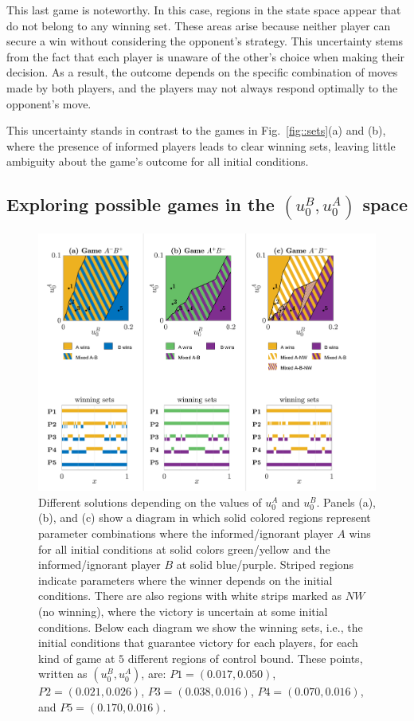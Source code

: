 This last game is noteworthy. In this case, regions in the state space appear that do not belong to any winning set. These areas arise because neither player can secure a win without considering the opponent’s strategy. This uncertainty stems from the fact that each player is unaware of the other’s choice when making their decision. As a result, the outcome depends on the specific combination of moves made by both players, and the players may not always respond optimally to the opponent's move.

This uncertainty stands in contrast to the games in Fig.~\ref{fig::sets}(a) and (b), where the presence of informed players leads to clear winning sets, leaving little ambiguity about the game’s outcome for all initial conditions.



\subsection{Exploring possible games in the $(u_0^B,u_0^A)$ space}

\begin{figure}
    \centering
    \includegraphics[trim={0.6cm 0cm 0cm 0cm}, clip,width=1.12\textwidth ]{Images/P5/franjas5.png}
    \caption{Different solutions depending on the values of $u^A_0$ and $u^B_0$. Panels (a), (b), and (c) show a diagram in which solid colored regions represent parameter combinations where the informed/ignorant player $A$ wins for all initial conditions at solid colors green/yellow and the informed/ignorant player $B$ at solid blue/purple. Striped regions indicate parameters where the winner depends on the initial conditions. There are also regions with white strips marked as $NW$ (no winning), where the victory is uncertain at some initial conditions. Below each diagram we show the winning sets, i.e., the initial conditions that guarantee victory for each players, for each kind of game at $5$ different regions of control bound. These points, written as $(u^B_0, u^A_0)$, are: $P1 =  (0.017, 0.050)$, $P2 =  (0.021, 0.026)$, $P3 =  (0.038, 0.016)$, $P4=  (0.070, 0.016)$, and $P5= (0.170, 0.016)$. 
    }
    \label{fig:franjas}
\end{figure}


